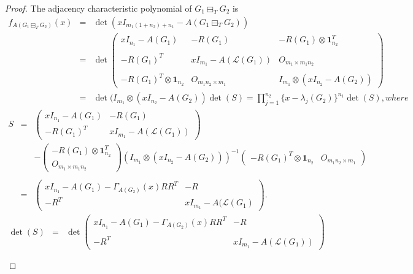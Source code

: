 \documentclass[10pt,a4paper]{amsart}
\begin{document}
\begin{proof}
\small
The adjacency characteristic polynomial of $G_{1} \boxminus_{T} G_{2}$ is
\begin{eqnarray*}
f_{A(G_{1} \boxminus_{T} G_{2})}(x)
&=&\det(xI_{m_{1}(1+n_{2})+n_{1}}-A(G_{1}\boxminus_{T} G_{2}))\\
&=&\det\begin{pmatrix}
xI_{n_{1}}-A(G_{1}) & -R(G_{1}) & -R(G_{1})\otimes \mathbf{1}_{n_{2}}^{T}\\\\
-R(G_{1})^{T} & xI_{m_{1}}-A(\mathcal{L}({G_{1}})) & O_{m_{1}\times m_{1}n_{2}}\\\\
-R(G_{1})^{T}\otimes \mathbf{1}_{n_{2}} & O_{m_{1}n_{2}\times m_{1}} & I_{m_{1}}\otimes (xI_{n_{2}}-A(G_{2}))
\end{pmatrix}\\
&=&\det(I_{m_{1}}\otimes (xI_{n_{2}}-A(G_{2}))\det(S)=\prod \limits_{j=1}^{n_{2}}\{x-\lambda_{j}(G_{2})\}^{n_{1}}\det(S), where
\end{eqnarray*}
\begin{eqnarray*}
S&=&\begin{pmatrix}
xI_{n_{1}}-A(G_{1}) & -R(G_{1}) \\
-R(G_{1})^{T} & xI_{m_{1}}-A(\mathcal{L}({G_{1}}))
\end{pmatrix}
\\&&-
\begin{pmatrix}
-R(G_{1})\otimes \mathbf{1}_{n_{2}}^{T} \\
O_{m_{1}\times m_{1}n_{2}}
\end{pmatrix}
(I_{m_{1}}\otimes (xI_{n_{2}}-A(G_{2})))^{-1}
\begin{pmatrix}
-R(G_{1})^{T}\otimes \mathbf{1}_{n_{2}} & O_{m_{1}n_{2}\times m_{1}}
\end{pmatrix}\\\\
&=&\begin{pmatrix}
xI_{n_{1}}-A(G_{1})-\Gamma_{A(G_{2})}(x)RR^{T} & -R \\
-R^{T} & xI_{m_{1}}-A(\mathcal{L}(G_{1})
\end{pmatrix}.
\end{eqnarray*}
\begin{eqnarray*}
\det(S)&=&\det\begin{pmatrix}
xI_{n_{1}}-A(G_{1})-\Gamma_{A(G_{2})}(x)RR^{T} & -R \\\\
-R^{T} & xI_{m_{1}}-A(\mathcal{L}(G_{1}))
\end{pmatrix}\\\\

\end{eqnarray*}
\end{proof}
\end{document}
